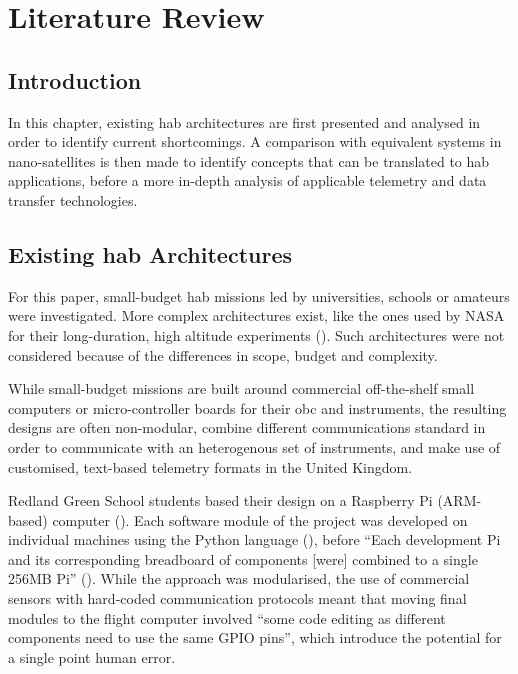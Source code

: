 \chapter{Literature Review}
\label{ch:literature-review}

\section{Introduction}

In this chapter, existing \acrlong{hab} architectures are first presented and analysed in order to identify current shortcomings. A comparison with equivalent systems in nano-satellites is then made to identify concepts that can be translated to \acrshort{hab} applications, before a more in-depth analysis of applicable telemetry and data transfer technologies.

\section{Existing \acrlong{hab} Architectures}

For this paper, small-budget \acrlong{hab} missions led by universities, schools or amateurs were investigated. More complex architectures exist, like the ones used by NASA for their long-duration, high altitude experiments (\cite{Eggers2016}). Such architectures were not considered because of the differences in scope, budget and complexity.

While small-budget missions are built around commercial off-the-shelf small computers or micro-controller boards for their \acrlong{obc} and instruments, the resulting designs are often non-modular, combine different communications standard in order to communicate with an heterogenous set of instruments, and make use of customised, text-based telemetry formats in the United Kingdom.

Redland Green School students based their design on a Raspberry Pi (ARM-based) computer (\cite{rpi2014}). Each software module of the project was developed on individual machines using the Python language (\cite{VanRossum2011}), before ``Each development Pi and its corresponding breadboard of components [were] combined to a single 256MB Pi'' (\cite{Hinschelwood2015}). While the approach was modularised, the use of commercial sensors with hard-coded communication protocols meant that moving final modules to the flight computer involved ``some code editing as different components need to use the same GPIO pins'', which introduce the potential for a single point human error.

